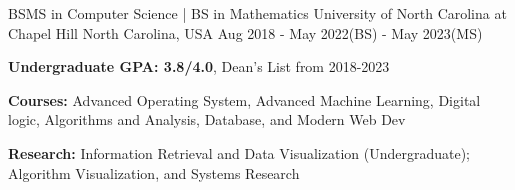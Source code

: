 

\begin{cventries}
\cventry
    {BSMS in Computer Science | BS in Mathematics} %
    {University of North Carolina at Chapel Hill} %
    {North Carolina, USA} %
    {Aug 2018 - May 2022(BS) - May 2023(MS)} %
    {
      \begin{cvitems} %
        \item {\textbf{Undergraduate GPA: 3.8/4.0}, Dean's List from 2018-2023}
        \item {\textbf{Courses:} Advanced Operating System, Advanced Machine Learning, Digital logic, Algorithms and Analysis, Database, and Modern Web Dev}
        \item {\textbf{Research:}  Information Retrieval and Data Visualization (Undergraduate); Algorithm Visualization, and Systems Research}
      \end{cvitems}
    }

\end{cventries}
